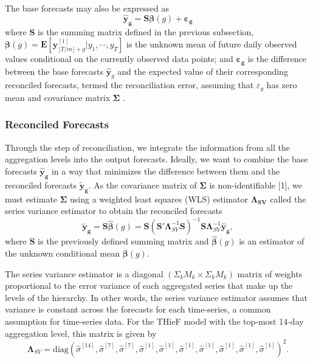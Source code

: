 \documentclass[12pt]{article}
\begin{document}
The base forecasts may also be expressed as \[\boldsymbol{\hat{y}_g} = \boldsymbol{S \beta}(g) + \boldsymbol{\varepsilon_g}\] where $\boldsymbol{S}$ is the summing matrix defined in the previous subsection, $\boldsymbol{\beta}(g) = \boldsymbol{E}[\boldsymbol{y}_{\lfloor T/m \rfloor + g}^{[1]} | y_1, \cdots, y_T]$ is the unknown mean of future daily observed values conditional on the currently observed data points; and $\boldsymbol{\varepsilon_g}$ is the difference between the base forecasts $\boldsymbol{\hat{y}}_g$ and the expected value of their corresponding reconciled forecasts, termed the reconciliation error, assuming that $\varepsilon_g$ has zero mean and covariance matrix $\boldsymbol{\Sigma}$ \cite{thief}.

\subsubsection{Reconciled Forecasts} \label{thief_reconciled_forecasts}
Through the step of reconciliation, we integrate the information from all the aggregation levels into the output forecasts. Ideally, we want to combine the base forecasts $\boldsymbol{\hat{y}_{g}}$ in a way that minimizes the difference between them and the reconciled forecasts $\boldsymbol{\tilde{y}_{g}}$. As the covariance matrix of $\boldsymbol{\Sigma}$ is non-identifiable [1], we must estimate $\boldsymbol{\Sigma}$ using a weighted least squares (WLS) estimator $\boldsymbol{\Lambda_{SV}}$ called the series variance estimator to obtain the reconciled forecasts \[\boldsymbol{\tilde{y}_g} = \boldsymbol{S \hat{\beta}}(g) = \boldsymbol{S}(\boldsymbol{S'\Lambda}_{SV}^{-1}\boldsymbol{S})^{-1}\boldsymbol{S \Lambda}_{SV}^{-1}\boldsymbol{\hat{y}_g},\] where $\boldsymbol{S}$ is the previously defined summing matrix and $\boldsymbol{\hat{\beta}}(g)$ is an estimator of the unknown conditional mean $\boldsymbol{\beta}(g)$\cite{thief}.

The series variance estimator is a diagonal $(\Sigma_k M_k \times \Sigma_k M_k)$ matrix of weights proportional to the error variance of each aggregated series that make up the levels of the hierarchy. In other words, the series variance estimator assumes that variance is constant across the forecasts for each time-series, a common assumption for time-series data\cite{thief}. For the THieF model with the top-most 14-day aggregation level, this matrix is given by
\[ \boldsymbol{\Lambda}_{SV} = \textrm{diag}(\hat{\sigma}^{[14]}, \hat{\sigma}^{[7]}, \hat{\sigma}^{[7]}, \hat{\sigma}^{[1]}, \hat{\sigma}^{[1]}, \hat{\sigma}^{[1]}, \hat{\sigma}^{[1]}, \hat{\sigma}^{[1]}, \hat{\sigma}^{[1]}, \hat{\sigma}^{[1]})^2. \]
\end{document}
